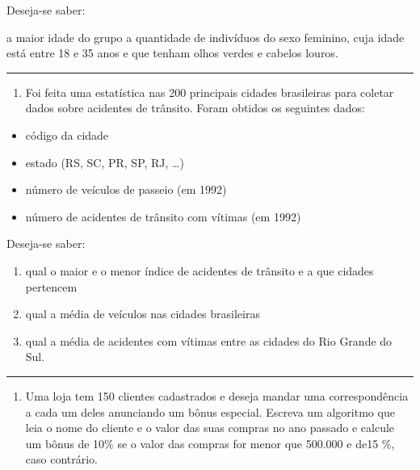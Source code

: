 \documentclass[12pt,a4paper]{article}
\renewcommand{\linethickness}{0.05em}
\providecommand{\tightlist}{%
      \setlength{\itemsep}{0pt}\setlength{\parskip}{0pt}}
\begin{document}
Deseja-se saber:

a maior idade do grupo a quantidade de indivíduos do sexo feminino, cuja
idade está entre 18 e 35 anos e que tenham olhos verdes e cabelos
louros.

    \begin{center}\rule{0.5\linewidth}{\linethickness}\end{center}

\begin{enumerate}
\def\labelenumi{\arabic{enumi}.}
\setcounter{enumi}{11}
\tightlist
\item
  Foi feita uma estatística nas 200 principais cidades brasileiras para
  coletar dados sobre acidentes de trânsito. Foram obtidos os seguintes
  dados:
\end{enumerate}

\begin{itemize}
\item
  código da cidade
\item
  estado (RS, SC, PR, SP, RJ, \ldots{})
\item
  número de veículos de passeio (em 1992)
\item
  número de acidentes de trânsito com vítimas (em 1992)
\end{itemize}

Deseja-se saber:

\begin{enumerate}
\def\labelenumi{\alph{enumi})}
\item
  qual o maior e o menor índice de acidentes de trânsito e a que cidades
  pertencem
\item
  qual a média de veículos nas cidades brasileiras
\item
  qual a média de acidentes com vítimas entre as cidades do Rio Grande
  do Sul.
\end{enumerate}

    \begin{center}\rule{0.5\linewidth}{\linethickness}\end{center}

\begin{enumerate}
\def\labelenumi{\arabic{enumi}.}
\setcounter{enumi}{12}
\tightlist
\item
  Uma loja tem 150 clientes cadastrados e deseja mandar uma
  correspondência a cada um deles anunciando um bônus especial. Escreva
  um algoritmo que leia o nome do cliente e o valor das suas compras no
  ano passado e calcule um bônus de 10\% se o valor das compras for
  menor que 500.000 e de15 \%, caso contrário.
\end{enumerate}
\end{document}
